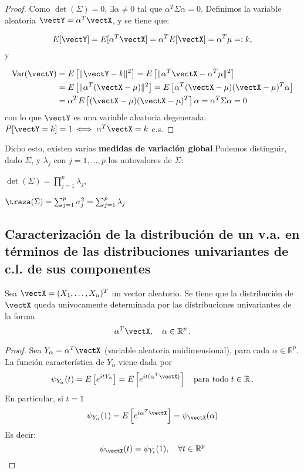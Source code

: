   \begin{proof}
    Como $\det(\Sigma) = 0$, $\exists \alpha \ne 0$ tal que $\alpha^T \Sigma \alpha = 0$. Definimos la variable aleatoria $\vectY = \alpha^T \vectX$, y se tiene que:
    
    \[
      E[\vectY] = E[\alpha^T \vectX] = \alpha^T E[\vectX] = \alpha^T \mu =: k
    ,\] y
    
     \[
        \begin{split}
          \operatorname{Var}(\vectY) & = E\left[\|\vectY-k\|^2\right]  = E\left[\|\alpha^T\vectX - \alpha^T \mu\|^2\right] \\
          & = E\left[\|\alpha^T(\vectX-\mu)\|^2\right] = E\left[\alpha^T(\vectX-\mu)(\vectX-\mu)^T\alpha\right] \\
          & = \alpha^T E\left[(\vectX-\mu)(\vectX-\mu)^T\right]\alpha = \alpha^T \Sigma \alpha = 0
        \end{split}  
     \]
      con lo que $\vectY$ es una variable aleatoria degenerada: $P[\vectY = k] = 1 \iff \alpha^T \vectX = k$ c.s.
  \end{proof}

Dicho esto, existen varias \textbf{medidas de variación global}.Podemos distinguir, dado $\Sigma$, y $\lambda_j$ con $j = 1,\dots,p$ los autovalores de $\Sigma$:
\begin{nlist}
\item $\det(\Sigma) =  \prod_{j=1}^p \lambda_j$,
  \item $\traza(\Sigma) = \sum_{j = 1}^p \sigma_j^2 = \sum_{j=1}^p \lambda_j$
\end{nlist}


\subsection{Caracterización de la distribución de un v.a. en términos de las distribuciones univariantes de c.l. de sus componentes}

\begin{nth}
  Sea $\vectX = (X_1,\dots, X_n)^T$ un vector aleatorio. Se tiene que la distribución de $\vectX$ queda unívocamente determinada por las distribuciones univariantes de la forma
  \[
\alpha ^T \vectX, \quad \alpha \in \mathbb R ^p\,.
  \]
\end{nth}
\begin{proof}
  Sea $Y_\alpha = \alpha^T \vectX$ (variable aleatoria unidimensional), para cada $\alpha \in \mathbb R^p$. La función característica de $Y_\alpha$ viene dada por
  \[
  \psi_{Y_\alpha}(t) = E\left[e^{itY_\alpha}\right] = E \left[e^{it(\alpha^T \vectX)}\right] \quad \text{para todo } t \in \mathbb R\,.
  \]
  En particular, si $t=1$
  \[
  \psi_{Y_\alpha}(1) = E\left[e^{i\alpha^T \vectX}\right] = \psi_{\vectX} (\alpha)
  \]
  Es decir:
  \[
  \psi_{\vectX}(t) = \psi_{Y_t}(1), \quad \forall t \in \mathbb R ^p
  \]
\end{proof}

